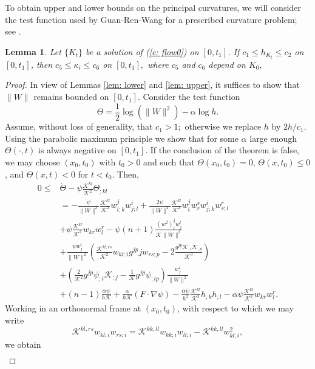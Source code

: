\documentclass{amsart}
\newtheorem{lemma}[theorem]{Lemma}
\theoremstyle{definition}
\theoremstyle{remark}
\numberwithin{equation}{section}
\begin{document}
 To obtain upper and lower bounds on the principal curvatures, we will consider the test function used by Guan-Ren-Wang for a prescribed curvature problem; see \cite[(4.2)]{Guan}.
\begin{lemma}\label{lem: final}
Let $\{K_t\}$ be a solution of (\ref{e: flow0}) on $[0,t_1]$. If $c_1\leq h_{K_t}\leq c_2$ on $[0,t_1]$, then $c_5\leq \kappa_i\le c_6$ on $[0,t_1],$ where $c_5$ and $c_6$ depend on $K_0,$
\end{lemma}
\begin{proof}
In view of Lemmas \ref{lem: lower} and \ref{lem: upper}, it suffices to show that $\|W\|$ remains bounded on $[0,t_1]$. Consider the test function
\[\Theta=\frac 12\log(\|W\|^2)-\alpha\log h.\]
Assume, without loss of generality, that $c_1> 1;$ otherwise we replace $h$ by $2h/c_1.$
Using the parabolic maximum principle we show that for some $\alpha$ large enough $\Theta(\cdot,t)$ is always negative on $[0,t_1]$. If the conclusion of the theorem is false, we may choose $(x_0,t_0)$ with $t_0>0$ and such that $\Theta(x_0,t_0)=0$, $\Theta(x, t_0) \leq 0$, and $\Theta(x,t) < 0$ for $t<t_0$. Then,
\begin{align*}
0 \leq& \dot{\Theta}-\psi\frac{\mathcal{K}^{kl}}{\mathcal{K}^2}\Theta_{;kl} \\
&= -\frac{\psi}{\|W\|^2} \frac{\mathcal{K}^{kl}}{\mathcal{K}^2} w_{i;k}^j w_{j;l}^i + \frac{2\psi}{\|W\|^4} \frac{\mathcal{K}^{kl}}{\mathcal{K}^2} w^j_iw^s_r w^i_{j;k} w^r_{s;l} \\
&+ \psi \frac{\mathcal{K}^{kl}}{\mathcal{K}^2} w_{kr}w_l^r - \psi(n+1) \frac{(w^2)_i^jw_j^i}{\mathcal{K}\|W\|^2} \\
&+ \frac{\psi w^i_j}{\|W\|^2} \left(\frac{\mathcal{K}^{kl,rs}}{\mathcal{K}^2} w_{kl;i} g^{jp}jw_{rs;p} - 2\frac{g^{jp} \mathcal{K}_{;i}\mathcal{K}_{;p}}{\mathcal{K}^3}\right) \\
&+ \left(\frac{2}{\mathcal{K}^2} g^{jp}\psi_{;i} \mathcal{K}_{;j} - \frac{1}{\mathcal{K}} g^{jp} \psi_{;ip}\right) \frac{w^i_j}{\|W\|^2} \\
& +(n-1) \frac{\alpha\psi}{h\mathcal{K}} + \frac{\alpha}{h\mathcal{K}} (F\cdot\nabla\psi) - \frac{\alpha\psi}{h^2} \frac{\mathcal{K}^{kl}}{\mathcal{K}^2} h_{;k}h_{;l} - \alpha\psi \frac{\mathcal{K}^{kl}}{\mathcal{K}^2} w_{kr}w_l^r.
\end{align*}
Working in an orthonormal frame at $(x_0,t_0)$, with respect to which we may write $$\mathcal{K}^{kl,rs}w_{kl;i}w_{rs;i}=\mathcal{K}^{kk,ll}w_{kk;i}w_{ll;i}-\mathcal{K}^{kk,ll}w_{kl;i}^2,$$ we obtain
\begin{align*}

\end{align*}
\end{proof}
\end{document}
